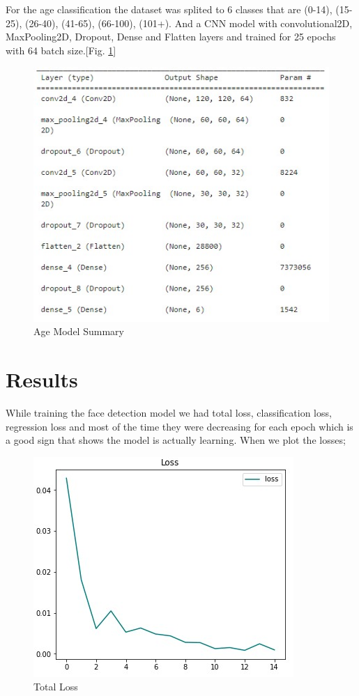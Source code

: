 \documentclass[conference]{IEEEtran}
\begin{document}
\bigskip

For the age classification the dataset was splited to 6 classes that are 
(0-14), (15-25), (26-40), (41-65), (66-100), (101+). And a CNN model with convolutional2D, MaxPooling2D, Dropout, Dense and Flatten layers and trained for 25 epochs with 64 batch size.[Fig. \ref{fig:Agemodelsummary}]

\begin{figure}[htbp]
\centering
\includegraphics[scale=0.65]{agemodelsummary.jpg}
\caption{Age Model Summary}
\label{fig:Agemodelsummary}
\end{figure}


\section{Results}

While training the face detection model we had total loss, classification loss, regression loss and most of the time they were decreasing for each epoch which is a good sign that shows the model is actually learning. When we plot the losses;

\begin{figure}[htbp]
\centering
\includegraphics[scale=0.75]{total_loss.jpg}
\caption{Total Loss}
\label{fig:TotalLoss}
\end{figure}
\end{document}
